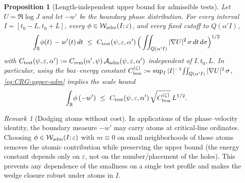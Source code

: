 \documentclass[11pt]{article}
\newtheorem{proposition}[theorem]{Proposition}
\theoremstyle{definition}
\theoremstyle{remark}
\newtheorem{remark}[theorem]{Remark}
\begin{document}
\begin{proposition}[Length‑independent upper bound for admissible tests]\label{prop:length-free}
Let $U=\Re\log J$ and let $-w'$ be the boundary phase distribution. For every interval $I=[t_0-L,t_0+L]$, every $\phi\in\mathcal W_{\rm adm}(I;\varepsilon)$, and every fixed cutoff to $Q(\alpha' I)$,
\begin{equation}\label{eq:CRG-upper-adm}
\int_{\mathbb R}\!\phi(t)\,-w'(t)\,dt\ \le\ C_{\rm test}(\psi,\varepsilon,\alpha')\,\Big(\iint_{Q(\alpha' I)}|\nabla U|^2\,\sigma\,dt\,d\sigma\Big)^{1/2}
\end{equation}
with $C_{\rm test}(\psi,\varepsilon,\alpha'):=C_{\rm rem}(\alpha',\psi)\,\mathcal A_{\rm adm}(\psi,\varepsilon,\alpha')$ independent of $I,t_0,L$. In particular, using the box–energy constant $C_{\rm box}^{(\zeta)}:=\sup_I |I|^{-1}\!\iint_{Q(\alpha' I)}|\nabla U|^2\,\sigma$, \eqref{eq:CRG-upper-adm} implies the scale bound
\[
  \int_{\mathbb R}\!\phi\,(-w')\ \le\ C_{\rm test}(\psi,\varepsilon,\alpha')\,\sqrt{C_{\rm box}^{(\zeta)}}\,L^{1/2}.
\]
\end{proposition}

\begin{remark}[Dodging atoms without cost]
In applications of the phase–velocity identity, the boundary measure $-w'$ may carry atoms at critical‑line ordinates. Choosing $\phi\in\mathcal W_{\rm adm}(I;\varepsilon)$ with $m\equiv0$ on small neighborhoods of those atoms removes the atomic contribution while preserving the upper bound (the energy constant depends only on $\varepsilon$, not on the number/placement of the holes). This prevents any dependence of the smallness on a single test profile and makes the wedge closure robust under atoms in $I$.
\end{remark}
\end{document}
